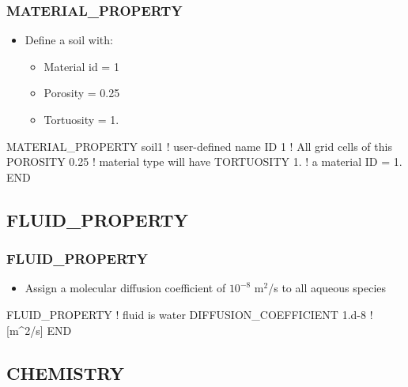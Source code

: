 \documentclass{beamer}
\newcommand\redcomment[1]{{{\color{red} #1}}}
\newcommand\bluecomment[1]{{{\color{blue} #1}}}
\begin{document}
\begin{frame}\frametitle{MATERIAL\_PROPERTY}

\begin{itemize}
  \item Define a soil with:
  \begin{itemize}
    \item Material id = 1
    \item Porosity = 0.25
    \item Tortuosity = 1.
  \end{itemize}
\end{itemize}

\begin{semiverbatim}


MATERIAL_PROPERTY soil1  \bluecomment{! user-defined name}
  ID 1                   \bluecomment{! All grid cells of this}
  POROSITY 0.25          \bluecomment{!   material type will have}
  TORTUOSITY 1.          \bluecomment{!   a material \redcomment{ID = 1}.}
END
\end{semiverbatim}

\end{frame}

\subsection{FLUID\_PROPERTY}

\begin{frame}\frametitle{FLUID\_PROPERTY}

\begin{itemize}
  \item Assign a molecular diffusion coefficient of $10^{-8}$ m$^2$/s to all aqueous species
\end{itemize}

\begin{semiverbatim}

FLUID_PROPERTY                  \bluecomment{! fluid is water}
  DIFFUSION_COEFFICIENT 1.d-8   \bluecomment{! [m^2/s]}
END
\end{semiverbatim}

\end{frame}

\subsection{CHEMISTRY}
\end{document}
